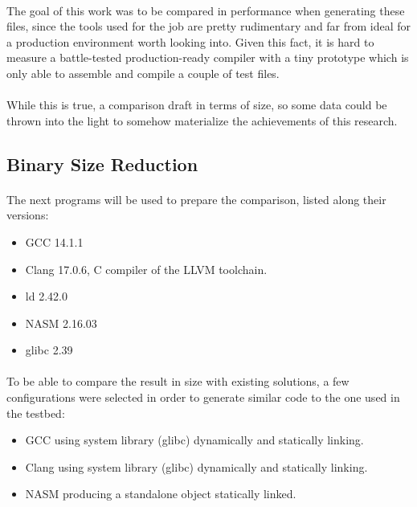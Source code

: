 \documentclass[12pt]{article}
\begin{document}
	\paragraph{}The goal of this work was to be compared in performance when generating these files, since the tools used for the job are pretty rudimentary and far from ideal for a production environment worth looking into. Given this fact, it is hard to measure a battle-tested production-ready compiler with a tiny prototype which is only able to assemble and compile a couple of test files.
	\paragraph{}While this is true, a comparison draft in terms of size, so some data could be thrown into the light to somehow materialize the achievements of this research.
	
	\subsection{Binary Size Reduction}
	\paragraph{}The next programs will be used to prepare the comparison, listed along their versions:
	\begin{itemize}
		\item \acrshort{GCC} 14.1.1
		\item Clang 17.0.6, C compiler of the \acrshort{LLVM} toolchain.
		\item ld 2.42.0
		\item \acrshort{NASM} 2.16.03
		\item \gls{glibc} 2.39
	\end{itemize}
	
	\paragraph{}To be able to compare the result in size with existing solutions, a few configurations were selected in order to generate similar code to the one used in the testbed:
	\begin{itemize}
		\item \acrshort{GCC} using system library (\gls{glibc}) dynamically and statically linking.
		\item Clang using system library (\gls{glibc}) dynamically and statically linking.
		\item \acrshort{NASM} producing a standalone object statically linked.
	\end{itemize}
	
\end{document}
